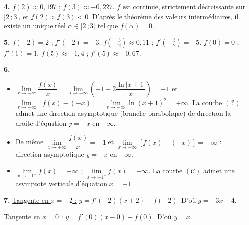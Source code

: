 \documentclass[11pt]{article}
\begin{document}
\textbf{4.} $f(2) \approx 0{,}197$ ; $f(3) \approx -0{,}227$. $f$ est continue, strictement décroissante sur $]2\,;3[$, et $f(2) \times f(3) < 0$. D'après le théorème des valeurs intermédiaires, il existe un unique réel $\alpha \in ]2\,;3[$ tel que $f(\alpha) = 0$.

\textbf{5.} $f(-2) = 2$ ; $f'(-2) = -3$. \quad $f\left(-\tfrac{3}{2}\right) \approx 0{,}11$ ; $f'\left(-\tfrac{3}{2}\right) = -5$. \quad $f(0) = 0$ ; $f'(0) = 1$. \quad $f(5) \approx -1{,}4$ ; $f'(5) \approx -0{,}67$.

\textbf{6.}
\begin{itemize}
  \item $\lim\limits_{x\to-\infty}\dfrac{f(x)}{x} = \lim\limits_{x\to-\infty}\left(-1 + 2\dfrac{\ln|x + 1|}{x}\right) = -1$ et $\lim\limits_{x\to-\infty}[f(x) - (-x)] = \lim\limits_{x\to-\infty}\ln(x + 1)^2 = +\infty$. La courbe $(\mathscr{C})$ admet une direction asymptotique (branche parabolique) de direction la droite d'équation $y = -x$ en $-\infty$.
  \item De même $\lim\limits_{x\to+\infty}\dfrac{f(x)}{x} = -1$ et $\lim\limits_{x\to+\infty}[f(x) - (-x)] = +\infty$ : direction asymptotique $y = -x$ en $+\infty$.
  \item $\lim\limits_{x\to-1^-} f(x) = -\infty$ ; $\lim\limits_{x\to-1^+} f(x) = -\infty$. La courbe $(\mathscr{C})$ admet une asymptote verticale d'équation $x = -1$.
\end{itemize}

\textbf{7.} \underline{Tangente en $x = -2$ :} $y = f'(-2)(x + 2) + f(-2)$. D'où $y = -3x - 4$.

\underline{Tangente en $x = 0$ :} $y = f'(0)(x - 0) + f(0)$. D'où $y = x$.
\begin{center}
\end{center}
\end{document}
